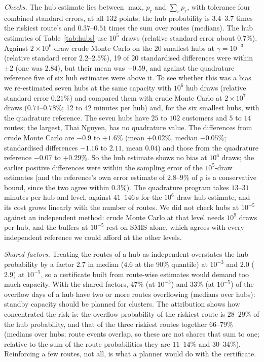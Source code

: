 \documentclass[ijoc,sglanonrev]{informs4}
\begin{document}
\emph{Checks.} The hub estimate lies between $\max_r p_r$ and $\sum_r p_r$,
with tolerance four combined standard errors, at all 132 points; the hub
probability is $3.4$--$3.7$ times the riskiest route's and $0.37$--$0.51$
times the sum over routes (medians). The hub estimates of Table~\ref{tab:hubs}
use $10^5$ draws (relative standard error about $0.7\%$). Against
$2\times10^6$-draw crude Monte Carlo on the 20 smallest hubs at
$\gamma=10^{-3}$ (relative standard error $2.2$--$2.5\%$), 19 of 20
standardised differences were within $\pm2$ (one was $2.84$), but their mean
was $+0.59$, and against the quadrature reference five of six hub estimates
were above it. To see whether this was a bias we re-estimated seven hubs at
the same capacity with $10^6$ hub draws (relative standard error $0.21\%$) and
compared them with crude Monte Carlo at $2\times10^7$ draws
($0.71$--$0.78\%$; 12 to 42 minutes per hub) and, for the six smallest hubs,
with the quadrature reference. The seven hubs have $25$ to $102$ customers and
$5$ to $14$ routes; the largest, Thai Nguyen, has no quadrature value. The
differences from crude Monte Carlo are $-0.9$ to $+1.6\%$ (mean $+0.02\%$,
median $-0.05\%$; standardised differences $-1.16$ to $2.11$, mean $0.04$) and
those from the quadrature reference $-0.07$ to $+0.29\%$. So the hub estimate
shows no bias at $10^6$ draws; the earlier positive differences were within the
sampling error of the $10^5$-draw estimates (and the reference's own error
estimate of $2.8$--$9\%$ of $p$ is a conservative bound, since the two
agree within $0.3\%$). The quadrature program takes $13$--$31$ minutes per hub
and level, against $41$--$146$\,s for the $10^6$-draw hub estimate, and its
cost grows linearly with the number of routes. We did not check hubs at
$10^{-5}$ against an independent method: crude Monte Carlo at that level needs
$10^9$ draws per hub, and the buffers at $10^{-5}$ rest on SMIS alone, which
agrees with every independent reference we could afford at the other levels.

\emph{Shared factors.} Treating the routes of a hub as independent
overstates the hub probability by a factor $2.7$ in median ($4.6$ at the 90\%
quantile) at $10^{-3}$ and $2.0$ ($2.9$) at $10^{-5}$, so a certificate built
from route-wise estimates would demand too much capacity. With the shared
factors, $47\%$ (at $10^{-3}$) and $33\%$ (at $10^{-5}$) of the overflow days
of a hub have two or more routes overflowing (medians over hubs): standby
capacity should be planned for clusters. The attribution shows how
concentrated the risk is: the overflow probability of the riskiest route is
$28$--$29\%$ of the hub probability, and that of the three riskiest routes
together $66$--$79\%$ (medians over hubs; route events overlap, so these are
not shares that sum to one; relative to the sum of the route probabilities they
are $11$--$14\%$ and $30$--$34\%$). Reinforcing a few routes, not all, is what
a planner would do with the certificate.
\end{document}
